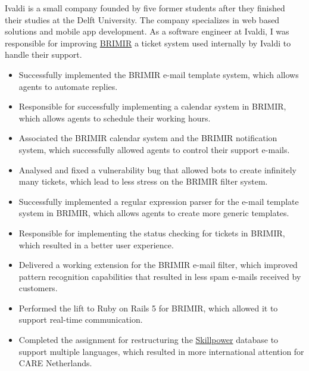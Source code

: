 {
  Ivaldi is a small company founded by five former students after they finished
  their studies at the Delft University. The company specializes in web based
  solutions and mobile app development. As a software engineer at Ivaldi, I was
  responsible for improving \href{https://getbrimir.com}{BRIMIR} a ticket
  system used internally by Ivaldi to handle their support.

  \SmallSep

  \begin{itemize}
    \item Successfully implemented the BRIMIR e-mail template system, which
      allows agents to automate replies.
    \item Responsible for successfully implementing a calendar system in
      BRIMIR, which allows agents to schedule their working hours.
    \item Associated the BRIMIR calendar system and the BRIMIR notification
      system, which successfully allowed agents to control their support
      e-mails.
    \item Analysed and fixed a vulnerability bug that allowed bots to create
      infinitely many tickets, which lead to less stress on the BRIMIR filter
      system.
    \item Successfully implemented a regular expression parser for the e-mail
      template system in BRIMIR, which allows agents to create more generic
      templates.
  \end{itemize}


  \clearpage

  \framebreak
  \framebreak

  \begin{itemize}
    \item Responsible for implementing the status checking for tickets in
      BRIMIR, which resulted in a better user experience.
    \item Delivered a working extension for the BRIMIR e-mail filter, which
      improved pattern recognition capabilities that resulted in less spam
      e-mails received by customers.
    \item Performed the lift to  Ruby on Rails 5 for BRIMIR, which allowed it
      to support real-time communication.
    \item Completed the assignment for restructuring the
      \href{https://skillpower.net}{Skillpower} database to support multiple
      languages, which resulted in more international attention for CARE
      Netherlands.
  \end{itemize}
}

